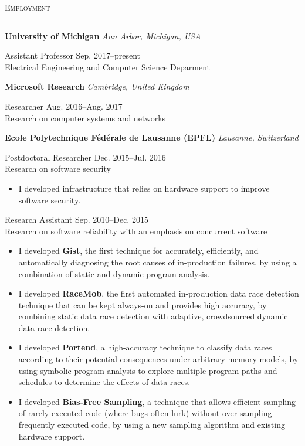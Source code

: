 \documentclass[10pt]{article}
\newcommand{\mysec}[1]{\vspace{2em}\textsc{\large #1}\vspace{1mm}\hrule\vspace{2mm}}
\newcommand{\mysub}[3]{\textbf{#1} {#2} \hfill {\em #3}}
\newcommand{\myssub}[1]{\hspace*{2mm}\parbox{163mm}{#1}\vspace*{2mm}}
\begin{document}
\mysec{Employment}

\mysub{University of Michigan}{}{Ann Arbor, Michigan, USA} \\
\myssub{Assistant Professor\vspace{1mm} \hfill Sep. 2017--present \\
Electrical Engineering and Computer Science Deparment}

\mysub{Microsoft Research}{}{Cambridge, United Kingdom} \\
\myssub{\vspace{1mm}Researcher \hfill Aug. 2016--Aug. 2017 \\
Research on computer systems and networks}

\mysub{Ecole Polytechnique F\'ed\'erale de Lausanne (EPFL)}{}{Lausanne, Switzerland} \\
\myssub{\vspace{1mm}Postdoctoral Researcher \hfill Dec. 2015--Jul. 2016 \\
Research on software security
\begin{itemize}
\item{I developed infrastructure that relies on hardware support to improve software security.}
\end{itemize}
}

\myssub{\vspace{1mm}Research Assistant \hfill Sep. 2010--Dec. 2015 \\
Research on software reliability with an emphasis on concurrent software
\vspace{-1mm}
\begin{itemize}
\setlength\itemsep{0em}
\item{I developed \textbf{Gist}, the first technique for accurately, efficiently, and automatically diagnosing the root causes of in-production failures, by using a combination of static and dynamic program analysis.}
\item{I developed \textbf{RaceMob}, the first automated in-production data race detection technique that can be kept always-on and provides high accuracy, by combining static data race detection with adaptive, crowdsourced dynamic data race detection.}
\item{I developed \textbf{Portend}, a high-accuracy technique to classify data races according to their potential consequences under arbitrary memory models, by using symbolic program analysis to explore multiple program paths and schedules to determine the effects of data races.}
\item{I developed \textbf{Bias-Free Sampling}, a technique that allows efficient sampling of rarely executed code (where bugs often lurk) without over-sampling frequently executed code, by using a new sampling algorithm and existing hardware support.}\\
\end{itemize}
\vspace{-5mm}
}
\end{document}
